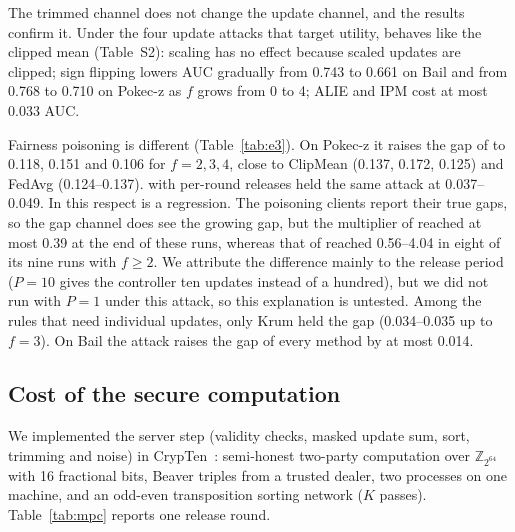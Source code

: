 

The trimmed channel does not change the update channel, and the results confirm it. Under the four update attacks that target utility, \rt{} behaves like the clipped mean (Table~S2): scaling has no effect because scaled updates are clipped; sign flipping lowers AUC gradually from 0.743 to 0.661 on Bail and from 0.768 to 0.710 on Pokec-z as $f$ grows from 0 to 4; ALIE and IPM cost at most 0.033 AUC.

Fairness poisoning is different (Table~\ref{tab:e3}). On Pokec-z it raises the gap of \rt{} to 0.118, 0.151 and 0.106 for $f=2,3,4$, close to ClipMean (0.137, 0.172, 0.125) and FedAvg (0.124--0.137). \clamp{} with per-round releases held the same attack at 0.037--0.049. In this respect \rt{} is a regression. The poisoning clients report their true gaps, so the gap channel does see the growing gap, but the multiplier of \rt{} reached at most 0.39 at the end of these runs, whereas that of \clamp{} reached 0.56--4.04 in eight of its nine runs with $f\ge2$. We attribute the difference mainly to the release period ($P=10$ gives the controller ten updates instead of a hundred), but we did not run \rt{} with $P=1$ under this attack, so this explanation is untested. Among the rules that need individual updates, only Krum held the gap (0.034--0.035 up to $f=3$). On Bail the attack raises the gap of every method by at most 0.014.

\subsection{Cost of the secure computation}\label{sec:mpc}



We implemented the server step (validity checks, masked update sum, sort, trimming and noise) in CrypTen~\citep{knott2021crypten}: semi-honest two-party computation over $\mathbb{Z}_{2^{64}}$ with 16 fractional bits, Beaver triples from a trusted dealer, two processes on one machine, and an odd-even transposition sorting network ($K$ passes). Table~\ref{tab:mpc} reports one release round.

